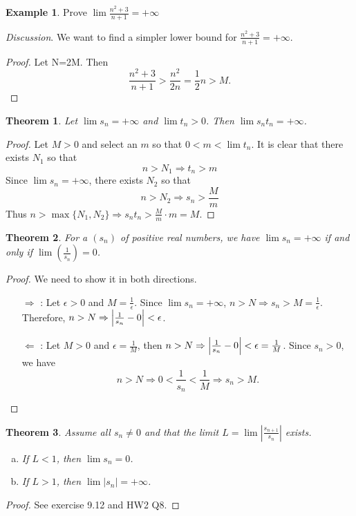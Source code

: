 \documentclass[12pt, lettersize]{book}
\theoremstyle{plain}
\newtheorem{thm}{Theorem}[section]
\theoremstyle{definition}
\newtheorem*{eg}{Example}
\theoremstyle{remark}
\begin{document}
		\begin{eg}
		Prove $\lim\frac{n^2+3}{n+1}=+\infty$
		\end{eg}
		\emph{Discussion}. We want to find a simpler lower bound for $\frac{n^2+3}{n+1}=+\infty$.
		\begin{proof}
		Let N=2M. Then
		\begin{displaymath}
			\frac{n^2+3}{n+1}>\frac{n^2}{2n}=\frac{1}{2}n>M.
		\end{displaymath}
		\end{proof}
		
		\begin{thm}
		Let $\lim s_n=+\infty$ and $\lim t_n>0$. Then $\lim s_nt_n=+\infty$.
		\end{thm}
		\begin{proof}
		Let $M>0$ and select an $m$ so that $0<m<\lim t_n$. It is clear that there exists $N_1$ so that
		\begin{displaymath}
			n>N_1 \Rightarrow t_n>m
		\end{displaymath}
		Since $\lim s_n=+\infty$, there exists $N_2$ so that 
		\begin{displaymath}
			n>N_2 \Rightarrow s_n>\frac{M}{m}
		\end{displaymath}
		Thus $n>\max\{N_1,N_2\} \Rightarrow s_nt_n>\frac{M}{m}\cdot m=M$.
		\end{proof}
		
		\begin{thm}
		For a $(s_n)$ of \emph{positive} real numbers, we have $\lim s_n=+\infty$ if and only if $\lim(\frac{1}{s_n})=0$.
		\end{thm}
		\begin{proof}
		We need to show it in both directions.
		\begin{itemize}
			\item[$\Rightarrow$]: Let $\epsilon>0$ and $M=\frac{1}{\epsilon}$. Since $\lim s_n=+\infty$, $n>N\Rightarrow s_n>M=\frac{1}{\epsilon}$.
			Therefore, $n>N\Rightarrow\abs{\frac{1}{s_n}-0}<\epsilon$. 
			\item[$\Leftarrow$]: Let $M>0$ and $\epsilon=\frac{1}{M}$, then $n>N\Rightarrow\abs{\frac{1}{s_n}-0}<\epsilon=\frac{1}{M}$. Since $s_n>0$, we have
			\begin{displaymath}
				n>N\Rightarrow 0<\frac{1}{s_n}<\frac{1}{M}\Rightarrow s_n>M.
			\end{displaymath} 
		\end{itemize}
		\end{proof}
		
		\begin{thm}
		Assume all $s_n\neq0$ and that the limit $L=\lim\left|\frac{s_{n+1}}{s_n}\right|$ exists.
		\begin{enumerate}[(a)]
			\item If $L<1$, then $\lim s_n=0$.
			\item If $L>1$, then $\lim |s_n|=+\infty$.
		\end{enumerate} 
		\end{thm}
		\begin{proof}
		See exercise 9.12 and HW2 Q8.
		\end{proof}
		
\end{document}
